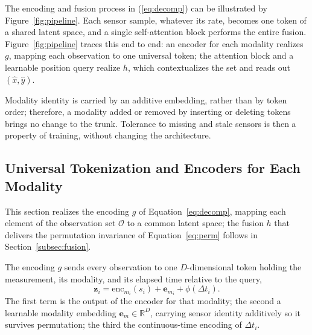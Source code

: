 The encoding and fusion process in (\ref{eq:decomp}) can be illustrated by Figure~\ref{fig:pipeline}. Each sensor sample, whatever its rate, becomes one token of a shared latent
space, and a single self-attention block performs the entire fusion.
Figure~\ref{fig:pipeline} traces this end to end: an encoder for each modality
realizes $g$, mapping each observation to one universal token; the attention
block and a learnable position query realize $h$, which contextualizes the set
and reads out $(\hat{x},\hat{y})$.

Modality identity is carried by an additive embedding, rather than by token order; therefore, a
modality added or removed by inserting or deleting tokens brings no change to the
trunk. Tolerance to missing and stale sensors is then a property of training, without changing the architecture.


\subsection{Universal Tokenization and Encoders for Each Modality}
\label{subsec:tok}

\noindent
This section realizes the encoding $g$ of Equation~\eqref{eq:decomp}, mapping each
element of the observation set $\mathcal{O}$ to a common latent space; the fusion
$h$ that delivers the permutation invariance of Equation~\eqref{eq:perm} follows in
Section~\ref{subsec:fusion}.

The encoding $g$ sends every observation to one $D$-dimensional token holding the
measurement, its modality, and its elapsed time relative to the query,
\begin{equation}\label{eq:token}
  \mathbf{z}_i = \mathrm{enc}_{m_i}(s_i)
               + \mathbf{e}_{m_i}
               + \phi(\Delta t_i).
\end{equation}
The first term is the output of the encoder for that modality; the second a
learnable modality embedding $\mathbf{e}_m \in \mathbb{R}^{D}$, carrying sensor identity additively so it survives
permutation; the third the continuous-time encoding of $\Delta t_i$.

